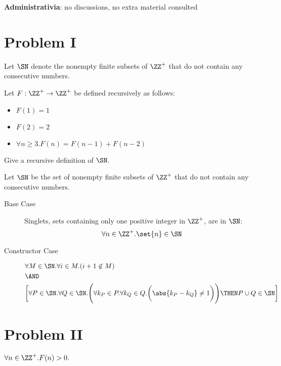 \documentclass[11pt, letterpaper]{scrartcl}
\author{Alexander Illarionov}
\date{\today}
\title{}
\begin{document}
\textbf{Administrativia}: no discussions, no extra material consulted
\section{Problem I}
Let $\SN$ denote the nonempty finite subsets of
$\ZZ^{+}$ that do not contain any consecutive numbers.

Let $F:\ZZ^+\to \ZZ^+$ be defined recursively as follows:

\begin{itemize}
\item $F(1) = 1$
\item $F(2) = 2$
\item $\forall n \geq 3.F(n) = F(n-1) + F(n-2)$
\end{itemize}

\begin{problem*}
Give a recursive definition of $\SN$.
\end{problem*}
\begin{soln}
  \hfill

  Let $\SN$ be the set of nonempty finite subsets of
$\ZZ^{+}$ that do not contain any consecutive numbers.

\begin{description}

\item[Base Case]
  \hfill

  Singlets, sets containing only one positive integer in $\ZZ^{+}$,
  are in $\SN$:
  \[
    \forall n \in \ZZ^{+}.\set{n}\in\SN
  \]
  
\item[Constructor Case]
  \hfill
  \begin{align*}
    &\forall M \in \SN.\forall i\in M.(i+1\not\in M)\\
    &\AND\\
    &\bigg[\forall P\in\SN.\forall Q\in\SN.\Bigg(\forall k_P\in P.\forall k_Q\in Q.\bigg(\abs{k_P-k_Q}\neq 1\bigg)\Bigg)\THEN P\cup Q \in \SN\bigg]
  \end{align*}
\end{description}
\end{soln}
\section{Problem II}
\begin{lemma}
  \label{sec:csc240-problem-set}
$\forall n\in\ZZ^{+}.F(n)>0.$
\end{lemma}
\end{document}
